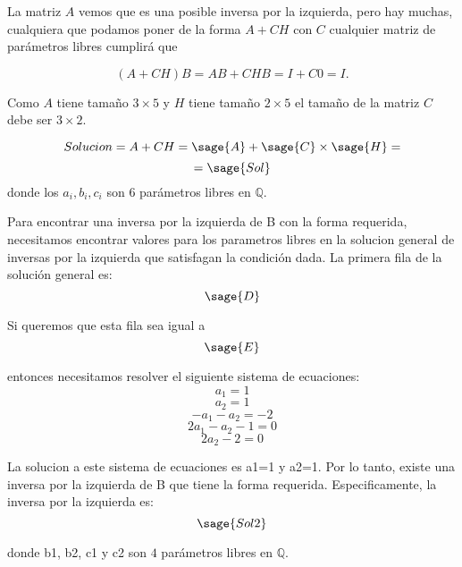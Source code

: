 \documentclass{amsart}
\begin{document}
La matriz $A$ vemos que es una posible inversa por la izquierda, pero hay muchas, cualquiera que podamos poner de la forma $A+CH$ con $C$ cualquier matriz de parámetros libres cumplirá que

$$ (A+CH)B = AB + CHB = I + C0 = I.$$

Como $A$ tiene tamaño $3 \times 5$ y $H$ tiene tamaño $2 \times 5$ el tamaño de la matriz $C$ debe ser $3 \times 2$.

$$ Solucion =  A+CH = \sage{A} + \sage{C} \times \sage{H} = $$
$$ = \sage{Sol} $$
donde los $a_i,b_i,c_i$ son $6$ parámetros libres en ${\mathbb Q}$.




Para encontrar una inversa por la izquierda de B con la forma requerida, necesitamos encontrar valores para los parametros libres en la solucion general de inversas por la izquierda que satisfagan la condición dada. La primera fila de la solución general es:
$$ \sage{D} $$

Si queremos que esta fila sea igual a
$$ \sage{E} $$

entonces necesitamos resolver el siguiente sistema de ecuaciones:
$$ a_1 = 1 $$
$$ a_2 = 1 $$
$$ -a_1-a_2 = -2 $$
$$ 2a_1-a_2-1 = 0 $$
$$ 2a_2-2 = 0 $$

La solucion a este sistema de ecuaciones es a1=1 y a2=1. Por lo tanto, existe una inversa por la izquierda de B que tiene la forma requerida. Especificamente, la inversa por la izquierda es:
$$ \sage{Sol2} $$

donde b1, b2, c1 y c2 son $4$ parámetros libres en ${\mathbb Q}$.
\end{document}
